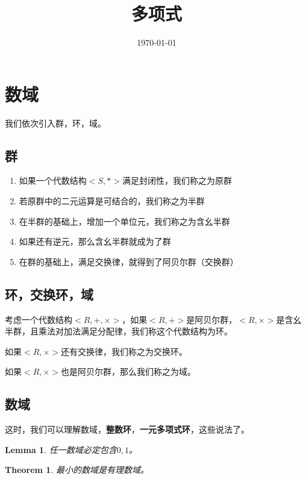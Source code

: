\documentclass{ctexart}
\title{多项式}
\author{}
\date{\today}
\begin{document}
\maketitle

\renewcommand{\proofname}{\indent\bf Proof}


\newtheorem{definition}{Definition}
\newtheorem{theorem}{Theorem}
\newtheorem{lemma}{Lemma}
\newtheorem{proposition}{Proposition}
\newtheorem{corollary}{Corollary}
\section{数域}

我们依次引入群，环，域。
\subsection{群}
\begin{enumerate}
    \item 如果一个代数结构$<S,*>$满足封闭性，我们称之为原群
    \item 若原群中的二元运算是可结合的，我们称之为半群
    \item 在半群的基础上，增加一个单位元，我们称之为含幺半群
    \item 如果还有逆元，那么含幺半群就成为了群
    \item 在群的基础上，满足交换律，就得到了阿贝尔群（交换群）
\end{enumerate}


\subsection{环，交换环，域}
考虑一个代数结构$<R,+,\times>$，如果$<R,+>$是阿贝尔群，$<R,\times>$是含幺半群，且乘法对加法满足分配律，我们称这个代数结构为环。

如果$<R,\times>$还有交换律，我们称之为交换环。

如果$<R,\times>$也是阿贝尔群，那么我们称之为域。

\subsection{数域}
这时，我们可以理解数域，\textbf{整数环}，\textbf{一元多项式环}，这些说法了。

\begin{lemma}
    任一数域必定包含$0,1$。
\end{lemma}
\begin{theorem}
    最小的数域是有理数域。
\end{theorem}
\end{document}
